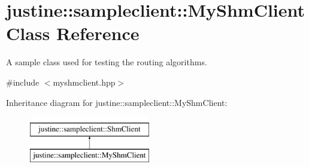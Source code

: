\hypertarget{classjustine_1_1sampleclient_1_1MyShmClient}{\section{justine\-:\-:sampleclient\-:\-:My\-Shm\-Client Class Reference}
\label{classjustine_1_1sampleclient_1_1MyShmClient}
}


A sample class used for testing the routing algorithms.  




{\ttfamily \#include $<$myshmclient.\-hpp$>$}

Inheritance diagram for justine\-:\-:sampleclient\-:\-:My\-Shm\-Client\-:\begin{figure}[H]
\begin{center}
\leavevmode
\includegraphics[height=2.000000cm]{classjustine_1_1sampleclient_1_1MyShmClient}
\end{center}
\end{figure}
